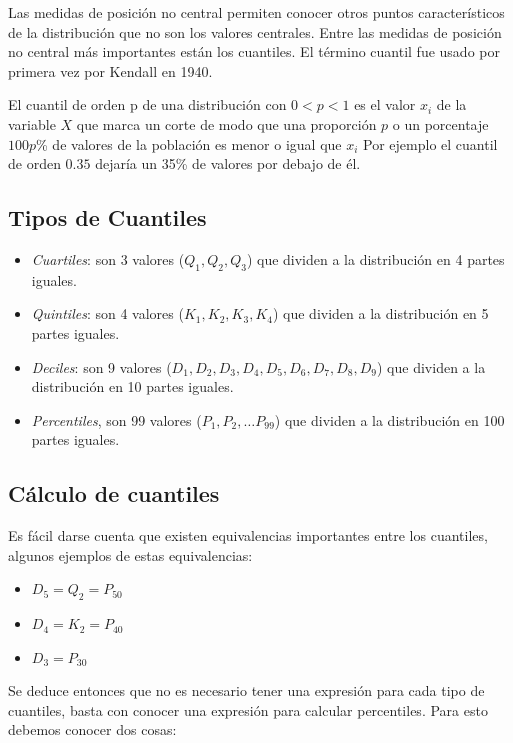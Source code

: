 \documentclass[]{book}
\providecommand{\tightlist}{%
  \setlength{\itemsep}{0pt}\setlength{\parskip}{0pt}}
\begin{document}
Las medidas de posición no central permiten conocer otros puntos
característicos de la distribución que no son los valores centrales.
Entre las medidas de posición no central más importantes están los
cuantiles. El término cuantil fue usado por primera vez por Kendall en
1940.

El cuantil de orden p de una distribución con \(0<p<1\) es el valor
\(x_{i}\) de la variable \(X\) que marca un corte de modo que una
proporción \(p\) o un porcentaje \(100p\)\% de valores de la población
es menor o igual que \(x_{i}\) Por ejemplo el cuantil de orden \(0.35\)
dejaría un 35\% de valores por debajo de él.

\subsection{Tipos de Cuantiles}\label{tipos-de-cuantiles}

\begin{itemize}
\item
  \emph{Cuartiles}: son 3 valores (\(Q_{1}, Q_{2}, Q_{3}\)) que dividen
  a la distribución en 4 partes iguales.
\item
  \emph{Quintiles}: son 4 valores (\(K_{1}, K_{2}, K_{3}, K_{4}\)) que
  dividen a la distribución en 5 partes iguales.
\item
  \emph{Deciles}: son 9 valores
  (\(D_1, D_2, D_3, D_4, D_5, D_6, D_7, D_8, D_9\)) que dividen a la
  distribución en 10 partes iguales.
\item
  \emph{Percentiles}, son 99 valores (\(P_1, P_2, \ldots P_{99}\)) que
  dividen a la distribución en 100 partes iguales.
\end{itemize}

\subsection{Cálculo de cuantiles}\label{calculo-de-cuantiles}

Es fácil darse cuenta que existen equivalencias importantes entre los
cuantiles, algunos ejemplos de estas equivalencias:

\begin{itemize}
\tightlist
\item
  \(D_5=Q_2=P_{50}\)
\item
  \(D_4=K_2=P_{40}\)
\item
  \(D_3=P_{30}\)
\end{itemize}

Se deduce entonces que no es necesario tener una expresión para cada
tipo de cuantiles, basta con conocer una expresión para calcular
percentiles. Para esto debemos conocer dos cosas:
\end{document}
